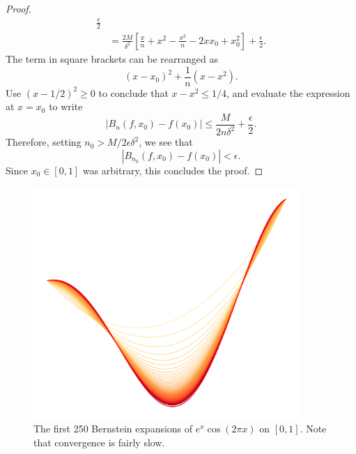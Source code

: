 \documentclass[11pt]{article}
\theoremstyle{definition}
\theoremstyle{remark}
\begin{document}
\begin{proof}
\begin{align*}
            \frac{\epsilon}{2} \\
            &= \frac{2M}{\delta^2}\left[\frac{x}{n} + x^2 - \frac{x^2}{n} - 2xx_0 +
            x_0^2\right] + \frac{\epsilon}{2}.
        \end{align*}
        The term in square brackets can be rearranged as \[
            (x - x_0)^2 + \frac{1}{n}(x - x^2).
        \] Use $(x - 1 / 2)^2 \geq 0$ to conclude that $x - x^2 \leq 1 / 4$, and
        evaluate the expression at $x = x_0$ to write \[
            |B_n(f, x_0) - f(x_0)| \leq \frac{M}{2n\delta^2} + \frac{\epsilon}{2}.
        \] Therefore, setting $n_0 > M / 2\epsilon\delta^2$, we see that \[
            |B_{n_0}(f, x_0) - f(x_0)| < \epsilon.
        \] Since $x_0 \in [0, 1]$ was arbitrary, this concludes the proof.
    \end{proof}
    
    \begin{figure}[ht]
        \centering
        \includegraphics[width=0.9\textwidth]{./img/expansions.png}
        \caption{The first 250 Bernstein expansions of $e^x\cos(2\pi x)$ on $[0, 1]$.
        Note that convergence is fairly slow.}
        \label{fig:expansion}
    \end{figure}
\end{document}
